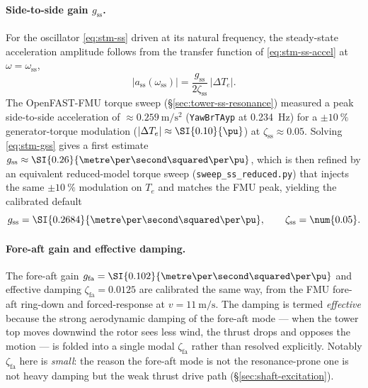 \paragraph{Side-to-side gain \(g_{\mathrm{ss}}\).}
For the oscillator \eqref{eq:stm-ss} driven at its natural frequency, the
steady-state acceleration amplitude follows from the transfer function of
\eqref{eq:stm-ss-accel} at \(\omega=\omega_{\mathrm{ss}}\),
\begin{equation}
  \big|a_{\mathrm{ss}}(\omega_{\mathrm{ss}})\big|
  = \frac{g_{\mathrm{ss}}}{2\zeta_{\mathrm{ss}}}\,\big|\Delta T_e\big|.
  \label{eq:stm-gss}
\end{equation}
The OpenFAST-FMU torque sweep (\S\ref{sec:tower-ss-resonance}) measured a peak
side-to-side acceleration of \(\approx\SI{0.259}{\metre\per\second\squared}\)
(\texttt{YawBrTAyp} at \SI{0.234}{\hertz}) for a \(\pm\SI{10}{\percent}\)
generator-torque modulation (\(|\Delta T_e|\approx\SI{0.10}{\pu}\)) at
\(\zeta_{\mathrm{ss}}\approx\num{0.05}\). Solving \eqref{eq:stm-gss} gives a
first estimate \(g_{\mathrm{ss}}\approx\SI{0.26}{\metre\per\second\squared\per\pu}\),
which is then refined by an equivalent reduced-model torque sweep
(\texttt{sweep\_ss\_reduced.py}) that injects the same \(\pm\SI{10}{\percent}\)
modulation on \(T_e\) and matches the FMU peak, yielding the calibrated default
\begin{equation}
  g_{\mathrm{ss}} = \SI{0.2684}{\metre\per\second\squared\per\pu},
  \qquad
  \zeta_{\mathrm{ss}} = \num{0.05}.
  \label{eq:stm-gss-value}
\end{equation}

\paragraph{Fore-aft gain and effective damping.}
The fore-aft gain \(g_{\mathrm{fa}} = \SI{0.102}{\metre\per\second\squared\per\pu}\)
and effective damping \(\zeta_{\mathrm{fa}} = \num{0.0125}\) are calibrated the
same way, from the FMU fore-aft ring-down and forced-response at
\(v = \SI{11}{\metre\per\second}\). The damping is termed \emph{effective}
because the strong aerodynamic damping of the fore-aft mode --- when the tower
top moves downwind the rotor sees less wind, the thrust drops and opposes the
motion --- is folded into a single modal \(\zeta_{\mathrm{fa}}\) rather than
resolved explicitly. Notably \(\zeta_{\mathrm{fa}}\) here is \emph{small}: the
reason the fore-aft mode is not the resonance-prone one is not heavy damping but
the weak thrust drive path (\S\ref{sec:shaft-excitation}).

